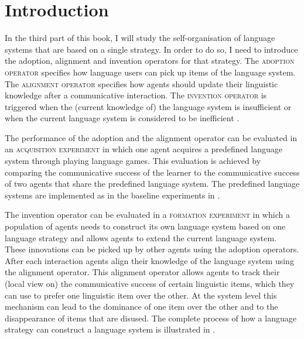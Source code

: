 \section*{Introduction}

\addtocounter{chapter}{1}
\setcounter{figure}{0}

In the third part of this book, I will study the self-organisation of
language systems that are based on a single strategy. In order to do
so, I need to introduce the adoption, alignment and invention
operators for that strategy. The \textsc{adoption operator} specifies how language users can pick up items of the language
system. The \textsc{alignment operator}
specifies how agents should
update their linguistic knowledge after a communicative
interaction. The \textsc{invention operator}
is triggered when the
(current knowledge of) the language system is insufficient or when the
current language system is considered to be inefficient
\citep{steels06how}.

The performance of the adoption and the alignment operator can be
evaluated in an \textsc{acquisition experiment} 
in which one agent
acquires a predefined language system through playing language games.
This evaluation is achieved by comparing the communicative success of the
learner to the communicative success of two agents that share the
predefined language system. The predefined language systems are
implemented as in the baseline experiments in .

The invention operator can be evaluated in a \textsc{formation
  experiment} in which a population of
agents needs to construct its own language system based on one
language strategy and allows agents to extend the current language
system. These innovations can be picked up by other agents using the
adoption operators. After each interaction agents align their
knowledge of the language system using the alignment operator. This
alignment operator allows agents to track their (local view on) the
communicative success of certain linguistic items, which they can use
to prefer one linguistic item over the other. At the system level this
mechanism can lead to the dominance of one item over the other and to
the disappearance of items that are disused. The complete process of
how a language strategy can construct a language system is illustrated
in .\enlargethispage{3\baselineskip}

